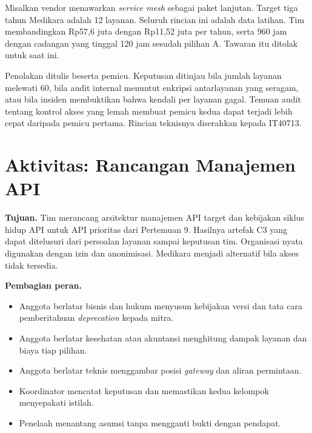 \begin{kasus}[title={Kasus Medikara Health: Menunda Service Mesh dengan Pemicu Tertulis}]
Misalkan vendor menawarkan \textit{service mesh} sebagai paket lanjutan. Target tiga tahun Medikara adalah 12 layanan.
Seluruh rincian ini adalah data latihan. Tim membandingkan Rp57,6 juta dengan Rp11,52 juta per tahun, serta 960 jam
dengan cadangan yang tinggal 120 jam sesudah pilihan A. Tawaran itu ditolak untuk saat ini.

Penolakan ditulis beserta pemicu. Keputusan ditinjau bila jumlah layanan melewati 60, bila audit internal menuntut
enkripsi antarlayanan yang seragam, atau bila insiden membuktikan bahwa kendali per layanan gagal. Temuan audit tentang
kontrol akses yang lemah membuat pemicu kedua dapat terjadi lebih cepat daripada pemicu pertama. Rincian teknisnya
diserahkan kepada IT40713.
\end{kasus}

\section{Aktivitas: Rancangan Manajemen API}

\textbf{Tujuan.} Tim merancang arsitektur manajemen API target dan kebijakan siklus hidup API untuk API prioritas dari
Pertemuan 9. Hasilnya artefak C3 yang dapat ditelusuri dari persoalan layanan sampai keputusan tim. Organisasi nyata
digunakan dengan izin dan anonimisasi. Medikara menjadi alternatif bila akses tidak tersedia.

\textbf{Pembagian peran.}
\begin{itemize}
  \item Anggota berlatar bisnis dan hukum menyusun kebijakan versi dan tata cara pemberitahuan \textit{deprecation}
        kepada mitra.
  \item Anggota berlatar kesehatan atau akuntansi menghitung dampak layanan dan biaya tiap pilihan.
  \item Anggota berlatar teknis menggambar posisi \textit{gateway} dan aliran permintaan.
  \item Koordinator mencatat keputusan dan memastikan kedua kelompok menyepakati istilah.
  \item Penelaah menantang asumsi tanpa mengganti bukti dengan pendapat.
\end{itemize}


